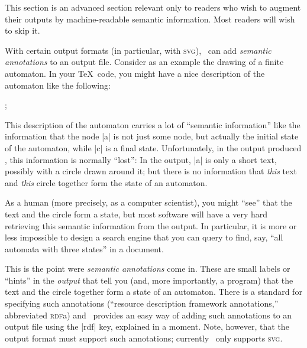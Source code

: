 \label{section-tikz-rdf}

This section is an advanced section relevant only to readers who wish
to augment their outputs by machine-readable semantic
information. Most readers will wish to skip it.

With certain output formats (in particular, with \textsc{svg}),
\tikzname\ can add \emph{semantic annotations} to an output
file. Consider as an example the drawing of a finite automaton. In your
\TeX\ code, you might have a nice description of the automaton like
the following:
\begin{codeexample}
\tikz[automaton] ;
\end{codeexample}
This description of the automaton carries a lot of ``semantic
information'' like the information that the node |a| is not just some
node, but actually the initial state of the automaton, while |c| is a
final state. Unfortunately, in the output produced \tikzname, this
information is normally ``lost'': In the output, |a| is only a short
text, possibly with a circle drawn around it; but there is no
information that \emph{this} text and \emph{this} circle together form
the state of an automaton.

As a human (more precisely, as a computer scientist), you might
``see'' that the text and the circle form a state, but most software
will have a very hard retrieving this semantic information from the
output. In particular, it is more or less impossible to design a
search engine that you can query to find, say, ``all automata with
three states'' in a document.

This is the point were \emph{semantic annotations} come in. These are
small labels or ``hints'' in the \emph{output} that tell you (and,
more importantly, a program) that the text and the circle together
form a state of an automaton. There is a standard for specifying such
annotations (``resource description framework annotations,''
abbreviated \textsc{rdf}a) and \tikzname\ provides an easy way of
adding such annotations to an output file using the |rdf| key,
explained in a moment. Note, however, that the output format must
support such annotations; currently \tikzname\ only supports
\textsc{svg}.

